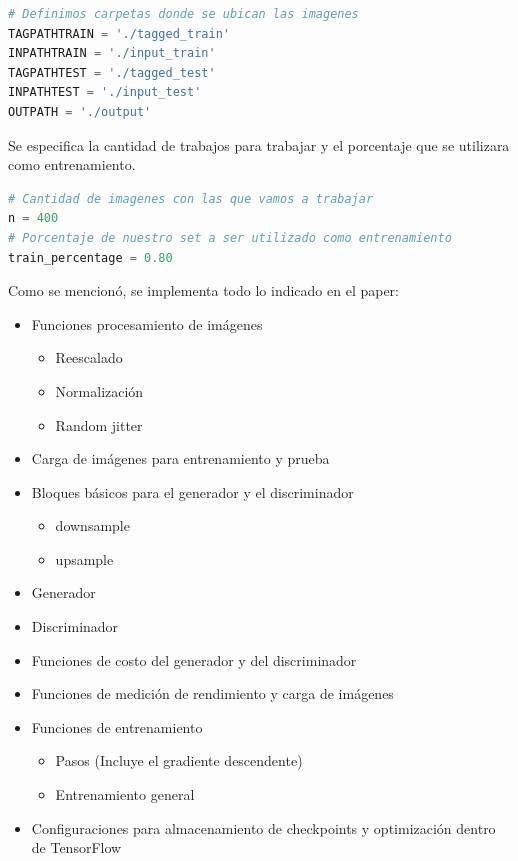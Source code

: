 \documentclass[10pt,journal,compsoc]{IEEEtran}\usepackage[T1]{fontenc}                              %
\begin{document}
\begin{lstlisting}[language=Python, basicstyle=\small]
# Definimos carpetas donde se ubican las imagenes
TAGPATHTRAIN = './tagged_train'
INPATHTRAIN = './input_train'
TAGPATHTEST = './tagged_test'
INPATHTEST = './input_test'
OUTPATH = './output'
\end{lstlisting}

Se especifica la cantidad de trabajos para trabajar y el porcentaje que
se utilizara como entrenamiento.

\begin{lstlisting}[language=Python, basicstyle=\small]
# Cantidad de imagenes con las que vamos a trabajar
n = 400
# Porcentaje de nuestro set a ser utilizado como entrenamiento
train_percentage = 0.80
\end{lstlisting}

Como se mencionó, se implementa todo lo indicado en el paper:

\begin{itemize}
\item
  Funciones procesamiento de imágenes

  \begin{itemize}
  \item
    Reescalado
  \item
    Normalización
  \item
    Random jitter
  \end{itemize}
\item
  Carga de imágenes para entrenamiento y prueba
\item
  Bloques básicos para el generador y el discriminador

  \begin{itemize}
  \item
    downsample
  \item
    upsample
  \end{itemize}
\item
  Generador
\item
  Discriminador
\item
  Funciones de costo del generador y del discriminador
\item
  Funciones de medición de rendimiento y carga de imágenes
\item
  Funciones de entrenamiento

  \begin{itemize}
  \item
    Pasos (Incluye el gradiente descendente)
  \item
    Entrenamiento general
  \end{itemize}
\item
  Configuraciones para almacenamiento de checkpoints y optimización
  dentro de TensorFlow
\end{itemize}
\end{document}
